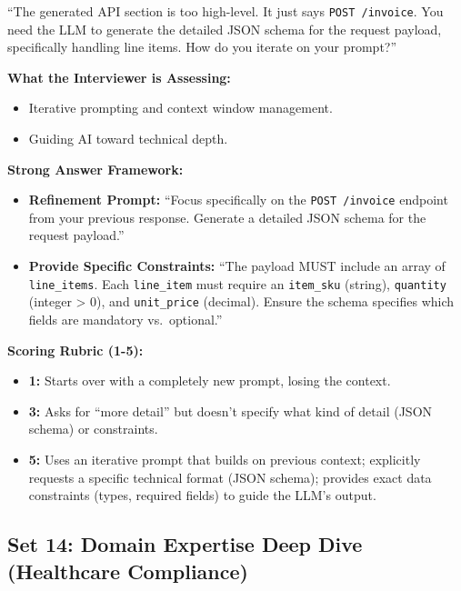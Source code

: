 ``The generated API section is too high-level. It just says
\texttt{POST\ /invoice}. You need the LLM to generate the detailed JSON
schema for the request payload, specifically handling line items. How do
you iterate on your prompt?''

\textbf{What the Interviewer is Assessing:}

\begin{itemize}
\tightlist
\item
  Iterative prompting and context window management.
\item
  Guiding AI toward technical depth.
\end{itemize}

\textbf{Strong Answer Framework:}

\begin{itemize}
\tightlist
\item
  \textbf{Refinement Prompt:} ``Focus specifically on the
  \texttt{POST\ /invoice} endpoint from your previous response. Generate
  a detailed JSON schema for the request payload.''
\item
  \textbf{Provide Specific Constraints:} ``The payload MUST include an
  array of \texttt{line\_items}. Each \texttt{line\_item} must require
  an \texttt{item\_sku} (string), \texttt{quantity} (integer
  \textgreater{} 0), and \texttt{unit\_price} (decimal). Ensure the
  schema specifies which fields are mandatory vs.~optional.''
\end{itemize}

\textbf{Scoring Rubric (1-5):}

\begin{itemize}
\tightlist
\item
  \textbf{1:} Starts over with a completely new prompt, losing the
  context.
\item
  \textbf{3:} Asks for ``more detail'' but doesn't specify what kind of
  detail (JSON schema) or constraints.
\item
  \textbf{5:} Uses an iterative prompt that builds on previous context;
  explicitly requests a specific technical format (JSON schema);
  provides exact data constraints (types, required fields) to guide the
  LLM's output.
\end{itemize}

\bigskip

\subsection{Set 14: Domain Expertise Deep Dive (Healthcare
Compliance)}\label{set-14-domain-expertise-deep-dive-healthcare-compliance}

